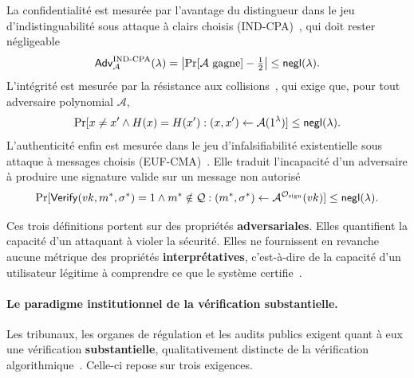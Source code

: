 \begin{sloppypar}
La confidentialit\'e est mesur\'ee par l'avantage du distingueur dans le
jeu d'indistinguabilit\'e sous attaque \`a clairs choisis (IND-CPA)~\cite{GoldwasserMicali84}, qui doit rester n\'egligeable
\begin{equation}
\label{eq:ind_cpa_advantage}
\mathsf{Adv}^{\text{IND-CPA}}_{\mathcal{A}}(\lambda) =
\left|\Pr[\mathcal{A} \text{ gagne}] - \tfrac{1}{2}\right| \leq \mathsf{negl}(\lambda).
\end{equation}
L'int\'egrit\'e est mesur\'ee par la r\'esistance aux collisions~\cite{Damgard87}, qui exige que, pour tout
adversaire polynomial $\mathcal{A}$,
\begin{equation}
\label{eq:collision_resistance}
\Pr[x \neq x' \land H(x) = H(x') : (x,x') \leftarrow \mathcal{A}(1^\lambda)]
\leq \mathsf{negl}(\lambda).
\end{equation}
L'authenticit\'e enfin est mesur\'ee dans le jeu d'infalsifiabilit\'e
existentielle sous attaque \`a messages choisis (EUF-CMA)~\cite{GMR88,Schnorr91}. Elle traduit l'incapacit\'e d'un adversaire \`a produire une signature valide sur un message non autoris\'e
\begin{equation}
\label{eq:euf_cma}
\Pr[\mathsf{Verify}(vk, m^*, \sigma^*) = 1 \land m^* \notin \mathcal{Q}
: (m^*, \sigma^*) \leftarrow \mathcal{A}^{\mathcal{O}_{\text{sign}}}(vk)]
\leq \mathsf{negl}(\lambda).
\end{equation}

Ces trois d\'efinitions portent sur des propri\'et\'es \textbf{adversariales}.
Elles quantifient la capacit\'e d'un attaquant \`a violer la s\'ecurit\'e.
Elles ne fournissent en revanche aucune m\'etrique des propri\'et\'es
\textbf{interpr\'etatives}, c'est-\`a-dire de la capacit\'e d'un utilisateur
l\'egitime \`a comprendre ce que le syst\`eme
certifie~\cite{Smith09,Alvim12,ClarksonSchneider10}.

\paragraph{Le paradigme institutionnel de la v\'erification substantielle.}
\label{par:paradigme_institutionnel}

Les tribunaux, les organes de r\'egulation et les audits publics exigent quant
\`a eux une v\'erification \textbf{substantielle},
qualitativement distincte de la v\'erification algorithmique~\cite{Casey11,Casey16,Mason07}.
Celle-ci repose sur trois exigences.


\end{sloppypar}
